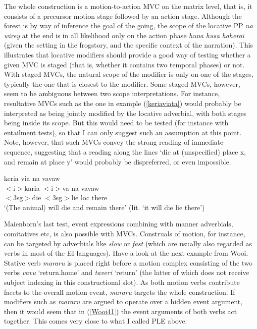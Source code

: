 The whole construction is a motion-to-action MVC on the matrix level, that is, it consists of a precursor motion stage followed by an action stage. Although the forest is by way of inference the goal of the going, the scope of the locative PP \textit{na wirey} at the end is in all likelihood only on the action phase \textit{huna husa haherai} (given the setting in the frogstory, and the specific context of the narration). This illustrates that locative modifiers should provide a good way of testing whether a given MVC is staged (that is, whether it contains two temporal phases) or not. With staged MVCs, the natural scope of the modifier is only on one of the stages, typically the one that is closest to the modifier. Some staged MVCs, however, seem to be ambiguous between two scope interpretations. For instance, resultative MVCs such as the one in example (\ref{keriaviata}) would probably be interpreted as being jointly modified by the locative adverbial, with both stages being inside its scope. But this would need to be tested (for instance with entailment tests), so that I can only suggest such an assumption at this point. Note, however, that such MVCs convey the strong reading of immediate sequence, suggesting that a reading along the lines `die at (unspecified) place x, and remain at place y' would probably be dispreferred, or even impossible.

\ea \label{keriaviata} 
\gll keria via na vavaw \\
$<$i$>$karia $<$i$>$va na vavaw \\
\glc $<$3\acs{sg}$>$die $<$3\acs{sg}$>$lie \acs{loc} there\\
\glft `(The animal) will die and remain there' (lit. `it will die lie there') \ 
\z
\xe

Maienborn's last test, event expressions combining with manner adverbials, comitatives etc, is also possible with MVCs. Construals of motion, for instance, can be targeted by adverbials like \textit{slow} or \textit{fast} (which are usually also regarded as verbs in most of the EI languages). Have a look at the next example from Wooi. Stative verb \textit{mararu} is placed right before a motion complex consisting of the two verbs \textit{vavu} `return.home' and \textit{taveri} `return' (the latter of which does not receive subject indexing in this constructional slot). As both motion verbs contribute facets to the overall motion event, \textit{mararu} targets the whole construction. If modifiers such as \textit{mararu} are argued to operate over a hidden event argument, then it would seem that in (\ref{Wooi41}) the event arguments of both verbs act together. This comes very close to what I called PLE above.

